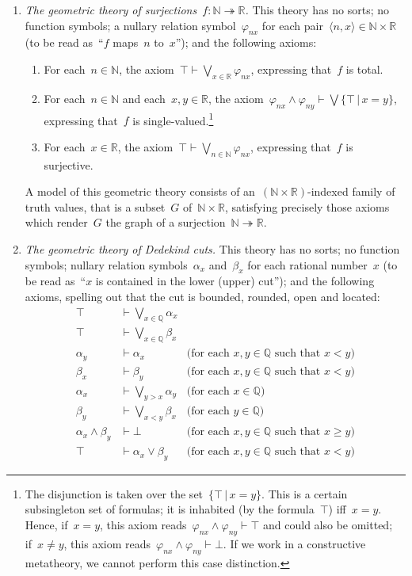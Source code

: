 \documentclass{ws-rv9x6}
\newcommand{\NN}{\mathbb{N}}
\newcommand{\QQ}{\mathbb{Q}}
\newcommand{\RR}{\mathbb{R}}
\renewcommand{\_}{\mathpunct{.}}
\newcommand{\?}{\,{:}\,}
\begin{document}
\begin{enumerate}
\item\label{item:theory-of-surjections} \emph{The geometric theory of surjections~$f : \NN \twoheadrightarrow
\RR$.} This theory has no
sorts; no function symbols; a nullary relation symbol~$\varphi_{nx}$ for each
pair~$\langle n,x \rangle \in \NN \times \RR$ (to be read as~``$f$ maps~$n$
to~$x$''); and the following axioms:
\begin{enumerate}
\item For each~$n \in \NN$, the axiom~$\top \vdash \bigvee_{x \in \RR}
\varphi_{nx}$, expressing that~$f$ is total.
\item For each~$n \in \NN$ and each~$x,y \in \RR$, the axiom~$\varphi_{nx}
\wedge \varphi_{ny} \vdash \bigvee\{ \top \,|\, x = y \}$,
expressing that~$f$ is single-valued.\footnote{The disjunction is taken over
the set~$\{ \top \,|\, x = y \}$. This is a certain subsingleton set of
formulas; it is inhabited (by the formula~$\top$) iff~$x = y$. Hence, if~$x =
y$, this axiom reads~$\varphi_{nx}
\wedge \varphi_{ny} \vdash \top$ and could also be omitted; if~$x \neq y$,
this axiom reads~$\varphi_{nx} \wedge \varphi_{ny} \vdash \bot$. If we work in
a constructive metatheory, we cannot perform this case distinction.}
\item For each~$x \in \RR$, the axiom~$\top \vdash \bigvee_{n \in \NN}
\varphi_{nx}$, expressing that~$f$ is surjective.
\end{enumerate}

A model of this geometric theory consists of an~$(\NN \times \RR)$-indexed
family of truth values, that is a subset~$G$ of~$\NN \times \RR$, satisfying
precisely those axioms which render~$G$ the graph of a surjection~$\NN
\twoheadrightarrow \RR$.

\item \emph{The geometric theory of Dedekind cuts.}\label{par:dedekind-cuts}
This theory has no sorts; no
function symbols; nullary relation symbols~$\alpha_x$ and~$\beta_x$ for each
rational number~$x$ (to be read as~``$x$ is contained in the lower (upper)
cut''); and the following axioms, spelling out that the cut is bounded,
rounded, open and located:
\begin{align*}
  \top &\vdash \textstyle\bigvee_{x \in \QQ} \alpha_x \\
  \top &\vdash \textstyle\bigvee_{x \in \QQ} \beta_x \\
  \alpha_y &\vdash \alpha_x & \text{(for each~$x,y \in \QQ$ such that~$x < y$)} \\
  \beta_x &\vdash \beta_y & \text{(for each~$x,y \in \QQ$ such that~$x < y$)} \\
  \alpha_x &\vdash \textstyle\bigvee_{y > x} \alpha_y & \text{(for each~$x \in \QQ$)} \\
  \beta_y &\vdash \textstyle\bigvee_{x < y} \beta_x & \text{(for each~$y \in \QQ$)} \\
  \alpha_x \wedge \beta_y &\vdash \bot & \text{(for each~$x,y \in \QQ$ such that~$x \geq y$)} \\
  \top &\vdash \alpha_x \vee \beta_y & \text{(for each~$x,y \in \QQ$ such that~$x < y$)}
\end{align*}


\end{enumerate}
\end{document}
